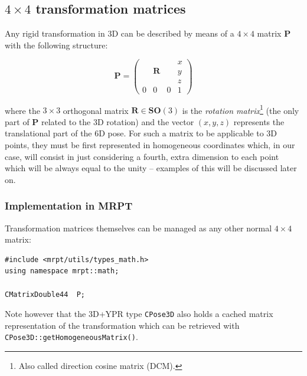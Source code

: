 \documentclass[a4paper,11pt]{report}
\begin{document}
%

\subsection{$4 \times 4$ transformation matrices}

Any rigid transformation in 3D can be described by means of a $4 \times 4$
matrix $\mathbf{P}$ with the following structure:

\begin{equation}
\mathbf{P}=\left(
  \begin{array}{ccc|c}
   & & & x \\
   & \mathbf{R} & & y \\
   & & & z \\ \hline
   0 & 0 & 0& 1
  \end{array}
\right)
\end{equation}

\noindent where the $3 \times 3$ orthogonal matrix $\mathbf{R} \in \mathbf{SO}(3)$
is the \emph{rotation matrix}\footnote{Also called direction cosine matrix (DCM).}
(the only part of $\mathbf{P}$ related to
the 3D rotation) and the vector $(x,y,z)$ represents the translational part of the 6D pose.
For such a matrix to be applicable to 3D points, they must be first represented in
homogeneous coordinates \cite{bloomenthal1994homogeneous} which, in our case, will consist in just considering a fourth,
extra dimension to each point which will be always equal to the unity -- examples of this will be discussed later on.


\subsubsection{Implementation in MRPT}

Transformation matrices themselves can be managed as any other normal $4\times 4$ matrix:

\begin{lstlisting}
#include <mrpt/utils/types_math.h>
using namespace mrpt::math;

CMatrixDouble44  P;
\end{lstlisting}

Note however that the 3D+YPR type \texttt{CPose3D} also holds a cached matrix representation
of the transformation which can be retrieved with \texttt{CPose3D::getHomogeneousMatrix()}.



\end{document}
